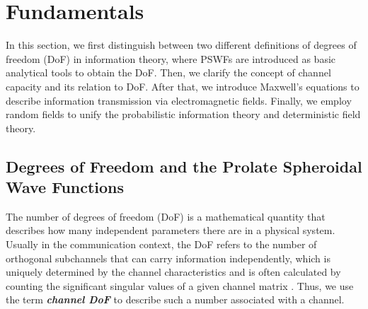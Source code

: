 \documentclass[journal,twocolumn]{IEEEtran}
\begin{document}
\section{Fundamentals}
In this section, we first distinguish between two different definitions of degrees of freedom (DoF) in information theory, where PSWFs are introduced as basic analytical tools to obtain the DoF. 
Then, we clarify the concept of channel capacity and its relation to DoF. 
After that, we introduce Maxwell's equations to describe information transmission via electromagnetic fields. 
Finally, we employ random fields to unify the probabilistic information theory and deterministic field theory. 



\subsection{Degrees of Freedom and the Prolate Spheroidal Wave Functions}
\label{Sec_2_Subsec_1}
The number of degrees of freedom (DoF) is a mathematical quantity that describes how many independent parameters there are in a physical system. 
Usually in the communication context, the DoF refers to the number of orthogonal subchannels that can carry information independently, which is uniquely determined by the channel characteristics and is often calculated by counting the significant singular values of a given channel matrix \cite{goldsmith2003capacity}. 
Thus, we use the term {\textbf{\emph{channel DoF}}} to describe such a number associated with a channel.
\end{document}
